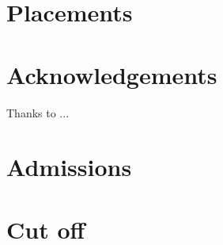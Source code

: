 \documentclass[final,5p,times,twocolumn,authoryear]{elsarticle}
\begin{document}
\section{Placements}
\lipsum[1-4]


\section*{Acknowledgements}
Thanks to ...

\appendix

\section{Admissions}


\section{Cut off}



 

\end{document}
